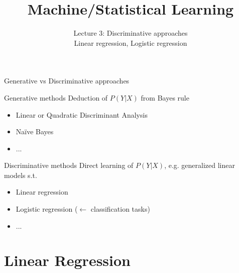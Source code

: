 \documentclass[compress, smaller, serif, 9pt]{beamer}
\title[Statistical Learning]{Machine/Statistical Learning}
\subtitle{Lecture 3: Discriminative approaches\\
Linear regression, Logistic regression}
\institute{Filière SICOM, 3A}
\date{}
\begin{document}
\maketitle

\begin{frame}{Generative vs Discriminative approaches}
 \begin{block}{Generative methods}
 Deduction of $P(Y|X)$ from Bayes rule
 \begin{itemize}
  \item Linear or Quadratic Discriminant Analysis
  \item Naïve Bayes
  \item ...
 \end{itemize}
 \end{block}
 
  \begin{block}{Discriminative methods}
Direct learning of $P(Y|X)$, e.g. generalized linear models s.t.
 \begin{itemize}
  \item Linear regression 
  \item Logistic regression ($\leftarrow$ classification tasks)
  \item ...
 \end{itemize}
 \end{block}
\end{frame}


\section{Linear Regression}
\end{document}
